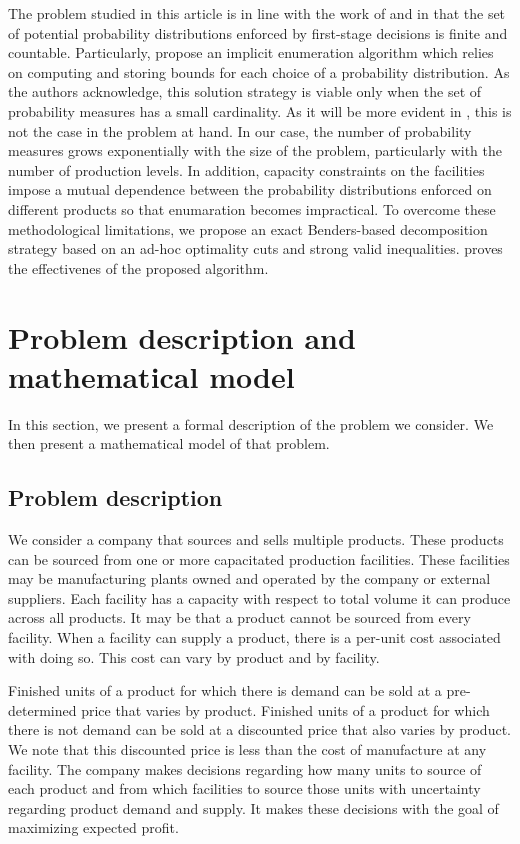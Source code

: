 \documentclass[12pt]{article}
\theoremstyle{thmstylethree}%
\begin{document}
The problem studied in this article is in line with the work of \cite{JonWW98} and \cite{Pan21} in that the set of potential probability distributions enforced by first-stage decisions is finite and countable.
Particularly, \cite{JonWW98} propose an implicit enumeration algorithm which relies on computing and storing bounds for each choice of a probability distribution. As the authors acknowledge, this solution strategy is viable only when the set of probability measures has a small cardinality.
As it will be more evident in , this is not the case in the problem at hand. In our case, the number of probability measures grows exponentially with the size of the problem, particularly with the number of production levels. In addition, capacity constraints on the facilities impose a mutual dependence between the probability distributions enforced on different products so that enumaration becomes impractical. To overcome these methodological limitations, we propose an exact Benders-based decomposition strategy based on an ad-hoc optimality cuts and strong valid inequalities.  proves the effectivenes of the proposed algorithm.


\section{Problem description and mathematical model}
\label{sec:problem_model}
In this section, we present a formal description of the problem we consider. We then present a mathematical model of that problem. 

\subsection{Problem description}
\label{subsec:problem}
\noindent
We consider a company that sources and sells multiple products. These products can be sourced from one or more capacitated production facilities. These facilities may be manufacturing plants owned and operated by the company or  external suppliers. Each facility has a capacity with respect to total volume it can produce across all products.  It may be that a product cannot be sourced from every facility. When a facility can supply a product, there is a per-unit cost associated with doing so. This cost can vary by product and by facility. 

Finished units of a product for which there is demand can be sold at a pre-determined price that varies by product. Finished units of a product for which there is not demand can be sold at a discounted price that also varies by product. We note that this discounted price is less than the cost of manufacture at any facility. The company makes decisions regarding how many units to source of each product and from which facilities to source those units with uncertainty regarding product demand and supply. It makes these decisions with the goal of maximizing expected profit.
\end{document}

